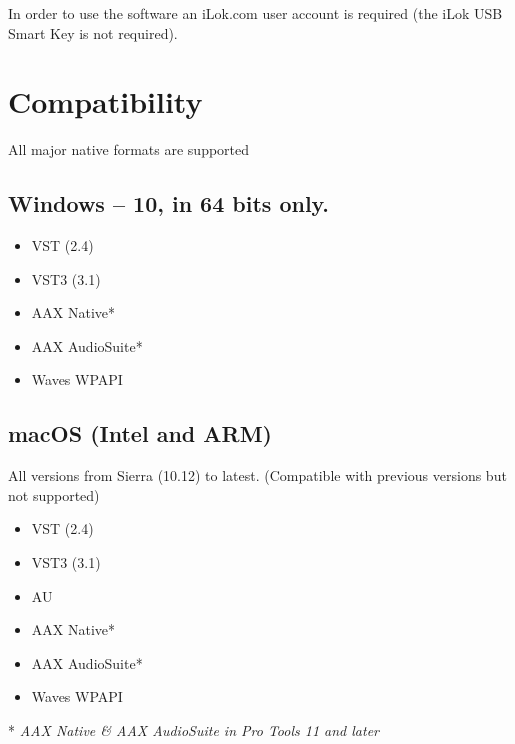 \documentclass[
  letterpaper,
  DIV=11,
  numbers=noendperiod]{scrreport}
\providecommand{\tightlist}{%
  \setlength{\itemsep}{0pt}\setlength{\parskip}{0pt}}\usepackage{longtable,booktabs,array}
\begin{document}
In order to use the software an iLok.com user account is required (the
iLok USB Smart Key is not required).

\hypertarget{compatibility}{%
\section{Compatibility}\label{compatibility}}

All major native formats are supported

\hypertarget{windows-10-in-64-bits-only.}{%
\subsection{Windows -- 10, in 64 bits
only.}\label{windows-10-in-64-bits-only.}}

\begin{itemize}
\tightlist
\item
  VST (2.4)
\item
  VST3 (3.1)
\item
  AAX Native*
\item
  AAX AudioSuite*
\item
  Waves WPAPI
\end{itemize}

\hypertarget{macos-intel-and-arm}{%
\subsection{macOS (Intel and ARM)}\label{macos-intel-and-arm}}

All versions from Sierra (10.12) to latest. (Compatible with previous
versions but not supported)

\begin{itemize}
\tightlist
\item
  VST (2.4)
\item
  VST3 (3.1)
\item
  AU
\item
  AAX Native*
\item
  AAX AudioSuite*
\item
  Waves WPAPI
\end{itemize}

* \emph{AAX Native \& AAX AudioSuite in Pro Tools 11 and later}
\end{document}

